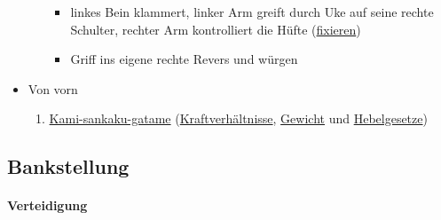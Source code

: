 \documentclass[justified, a4paper, notitlepage, captions=tableheading, nobib]{tufte-handout}
\begin{document}
\begin{itemize}
\begin{enumerate}
\begin{itemize}
\item linkes Bein klammert, linker Arm greift durch Uke auf seine rechte Schulter, rechter Arm kontrolliert die Hüfte (\hyperref[org62822f6]{fixieren})
\item Griff ins eigene rechte Revers und würgen
\end{itemize}
\end{enumerate}
\item Von vorn
\begin{enumerate}
\item \hyperref[orgfe1fdeb]{Kami-sankaku-gatame} (\hyperref[org19c3698]{Kraftverhältnisse}, \hyperref[org889513a]{Gewicht} und \hyperref[org6c6f271]{Hebelgesetze})
\end{enumerate}
\end{itemize}

\subsection{\label{orgd4877a8}Bankstellung }
\label{sec:org279110d}

\paragraph{Verteidigung}
\label{sec:org2cf17d1}
\end{document}

